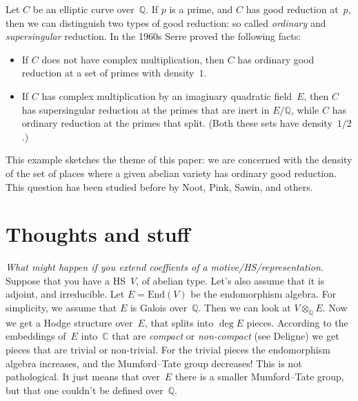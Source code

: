 \documentclass{amsart}
\begin{document}
Let $C$ be an elliptic curve over~$\mathbb{Q}$.
If $p$ is a prime, and $C$ has good reduction at~$p$,
then we can distinguish two types of good reduction:
so called \emph{ordinary} and \emph{supersingular} reduction.
In the 1960s %
Serre proved the following facts:
\begin{itemize}
 \item If $C$ does not have complex multiplication,
  then $C$ has ordinary good reduction at
  a set of primes with density~$1$.
 \item If $C$ has complex multiplication by an
  imaginary quadratic field~$E$,
  then $C$ has supersingular reduction
  at the primes that are inert in $E/\mathbb{Q}$,
  while $C$ has ordinary reduction at the primes that split.
  (Both these sets have density~$1/2$.)
\end{itemize}
This example sketches the theme of this paper:
we are concerned with the density of the set of places
where a given abelian variety has ordinary good reduction.
This question has been studied before by
Noot, Pink, Sawin, and others.

\section{Thoughts and stuff}

\bigskip\noindent
\emph{What might happen if you extend coeffients of a motive/HS/representation.}\quad
Suppose that you have a HS~$V$, of abelian type.
Let's also assume that it is adjoint, and irreducible.
Let $E = \mathrm{End}(V)$ be the endomorphism algebra.
For simplicity, we assume that $E$ is Galois over~$\mathbb{Q}$.
Then we can look at $V \otimes_{\mathbb{Q}} E$.
Now we get a Hodge structure over~$E$, that splits into $\deg{E}$ pieces.
According to the embeddings of~$E$ into~$\mathbb{C}$
that are \emph{compact} or \emph{non-compact} (see Deligne)
we get pieces that are trivial or non-trivial.
For the trivial pieces the endomorphism algebra increases,
and the Mumford--Tate group decreases!
This is not pathological.
It just means that over~$E$ there is a smaller Mumford--Tate group,
but that one couldn't be defined over~$\mathbb{Q}$.

\printbibliography
\end{document}
